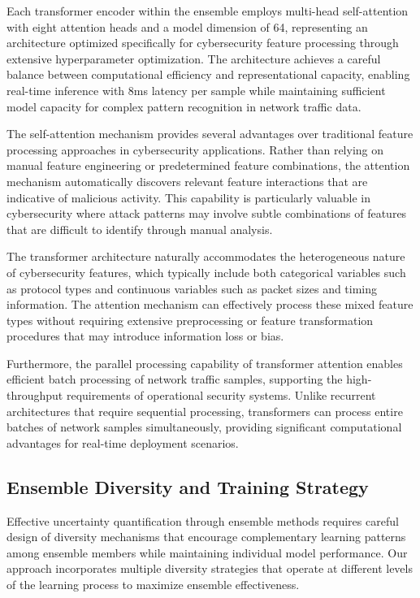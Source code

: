 \documentclass[journal]{IEEEtran}
\begin{document}
Each transformer encoder within the ensemble employs multi-head self-attention with eight attention heads and a model dimension of 64, representing an architecture optimized specifically for cybersecurity feature processing through extensive hyperparameter optimization. The architecture achieves a careful balance between computational efficiency and representational capacity, enabling real-time inference with 8ms latency per sample while maintaining sufficient model capacity for complex pattern recognition in network traffic data.

The self-attention mechanism provides several advantages over traditional feature processing approaches in cybersecurity applications. Rather than relying on manual feature engineering or predetermined feature combinations, the attention mechanism automatically discovers relevant feature interactions that are indicative of malicious activity. This capability is particularly valuable in cybersecurity where attack patterns may involve subtle combinations of features that are difficult to identify through manual analysis.

The transformer architecture naturally accommodates the heterogeneous nature of cybersecurity features, which typically include both categorical variables such as protocol types and continuous variables such as packet sizes and timing information. The attention mechanism can effectively process these mixed feature types without requiring extensive preprocessing or feature transformation procedures that may introduce information loss or bias.

Furthermore, the parallel processing capability of transformer attention enables efficient batch processing of network traffic samples, supporting the high-throughput requirements of operational security systems. Unlike recurrent architectures that require sequential processing, transformers can process entire batches of network samples simultaneously, providing significant computational advantages for real-time deployment scenarios.

\subsection{Ensemble Diversity and Training Strategy}

Effective uncertainty quantification through ensemble methods requires careful design of diversity mechanisms that encourage complementary learning patterns among ensemble members while maintaining individual model performance. Our approach incorporates multiple diversity strategies that operate at different levels of the learning process to maximize ensemble effectiveness.
\end{document}

